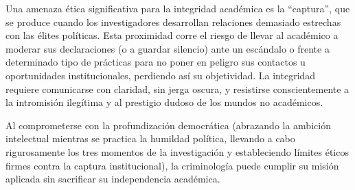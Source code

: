 \documentclass[
  spanish,
  letterpaper,
  DIV=11,
  numbers=noendperiod]{scrreprt}
\begin{document}
Una amenaza ética significativa para la integridad académica es la
``captura'', que se produce cuando los investigadores desarrollan
relaciones demasiado estrechas con las élites políticas. Esta proximidad
corre el riesgo de llevar al académico a moderar sus declaraciones (o a
guardar silencio) ante un escándalo o frente a determinado tipo de
prácticas para no poner en peligro sus contactos u oportunidades
institucionales, perdiendo así su objetividad. La integridad requiere
comunicarse con claridad, sin jerga oscura, y resistirse conscientemente
a la intromisión ilegítima y al prestigio dudoso de los mundos no
académicos.

Al comprometerse con la profundización democrática (abrazando la
ambición intelectual mientras se practica la humildad política, llevando
a cabo rigurosamente los tres momentos de la investigación y
estableciendo límites éticos firmes contra la captura institucional), la
criminología puede cumplir su misión aplicada sin sacrificar su
independencia académica.
\end{document}
